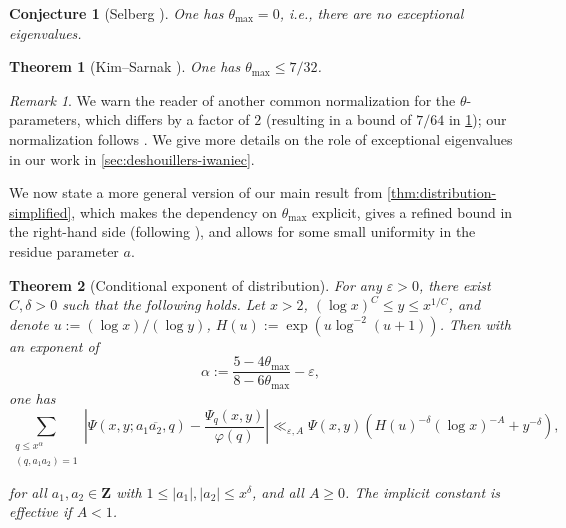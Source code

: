 \documentclass[reqno,11pt]{amsart}
\newtheorem{theorem}{Theorem}[section]
\newtheorem{conjecture}[theorem]{Conjecture}
\newtheorem{knowntheorem}{Theorem}
\theoremstyle{definition}
\theoremstyle{remark}
\newtheorem*{remark}{Remark}
\numberwithin{equation}{section}
\newcommand{\Z}{\mathbf{Z}}
\newcommand{\eps}{\varepsilon}
\renewcommand{\bar}{\overline}
\begin{document}
\begin{conjecture}[Selberg \cite{selberg1965estimation}] \label{conj:selberg}
One has $\theta_{\max} = 0$, i.e., there are no exceptional eigenvalues.
\end{conjecture}

\begin{knowntheorem}[Kim--Sarnak \cite{kim2003functoriality}] \label{thm:kim-sarnak}
One has $\theta_{\max} \le 7/32$.
\end{knowntheorem}

\begin{remark}
We warn the reader of another common normalization for the $\theta$-parameters, which differs by a factor of $2$ (resulting in a bound of $7/64$ in \cref{thm:kim-sarnak}); our normalization follows \cite{deshouillers1982kloosterman, maynard2020primes}. We give more details on the role of exceptional eigenvalues in our work in \cref{sec:deshouillers-iwaniec}.
\end{remark}

We now state a more general version of our main result from \cref{thm:distribution-simplified}, which makes the dependency on $\theta_{\max}$ explicit, gives a refined bound in the right-hand side (following \cite{drappeau2015theoremes}), and allows for some small uniformity in the residue parameter $a$.


\begin{theorem}[Conditional exponent of distribution] \label{thm:distribution}
For any $\eps > 0$, there exist $C, \delta > 0$ such that the following holds. 
Let $x > 2$, $(\log x)^C \le y \le x^{1/C}$, and denote $u := (\log x)/(\log y)$, $H(u) := \exp \left(u \log^{-2} (u+1)\right)$. Then with an exponent of
\begin{equation} \label{eq:exponent-theta}
    \alpha := \frac{5-4\theta_{\max}}{8-6\theta_{\max}} - \eps,
\end{equation}
one has
\begin{equation} \label{eq:exponent}
    \sum_{\substack{q \le x^{\alpha} \\ (q, a_1 a_2) = 1}} 
    \left\vert \Psi(x, y; a_1 \bar{a_2}, q) - \frac{\Psi_q(x, y)}{\varphi(q)}
    \right\vert 
    \ll_{\eps, A} 
    \Psi(x, y) \left(H(u)^{-\delta} (\log x)^{-A} + y^{-\delta}\right),
\end{equation}

for all $a_1, a_2 \in \Z$ with $1 \le |a_1|, |a_2| \le x^\delta$, and all $A \ge 0$. The implicit constant is effective if $A < 1$.
\end{theorem}
\end{document}
